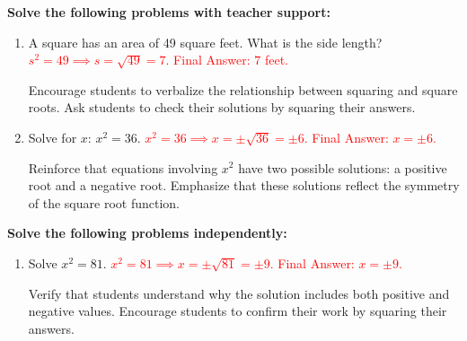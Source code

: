 \documentclass[12pt]{article}
\begin{document}
\begin{tcolorbox}[colframe=black!60, colback=white, 
coltitle=black, colbacktitle=black!15, fonttitle=\bfseries\Large, 
title=Guided Practice, halign title=center, left=10pt, right=10pt, top=10pt, bottom=15pt]
\textbf{Solve the following problems with teacher support:}

\begin{enumerate}[itemsep=5em]
    \item A square has an area of 49 square feet. What is the side length?  
    \textcolor{red}{\(s^2 = 49 \implies s = \sqrt{49} = 7.\) Final Answer: \(7\) feet.}
    
    {\color{blue} Encourage students to verbalize the relationship between squaring and square roots. Ask students to check their solutions by squaring their answers.}
    
    \item Solve for \(x\): \(x^2 = 36\).  
    \textcolor{red}{\(x^2 = 36 \implies x = \pm \sqrt{36} = \pm 6.\) Final Answer: \(x = \pm 6\).}
    
    {\color{blue} Reinforce that equations involving \(x^2\) have two possible solutions: a positive root and a negative root. Emphasize that these solutions reflect the symmetry of the square root function.}
\end{enumerate}
\end{tcolorbox}

\vspace{1em}

\begin{tcolorbox}[colframe=black!60, colback=white, 
coltitle=black, colbacktitle=black!15, fonttitle=\bfseries\Large, 
title=Independent Practice, halign title=center, left=10pt, right=10pt, top=10pt, bottom=15pt]
\textbf{Solve the following problems independently:}

\begin{enumerate}[itemsep=5em]
    \item Solve \(x^2 = 81\).  
    \textcolor{red}{\(x^2 = 81 \implies x = \pm \sqrt{81} = \pm 9.\) Final Answer: \(x = \pm 9\).}
    
    {\color{blue} Verify that students understand why the solution includes both positive and negative values. Encourage students to confirm their work by squaring their answers.}
\end{enumerate}
\end{tcolorbox}
\end{document}
